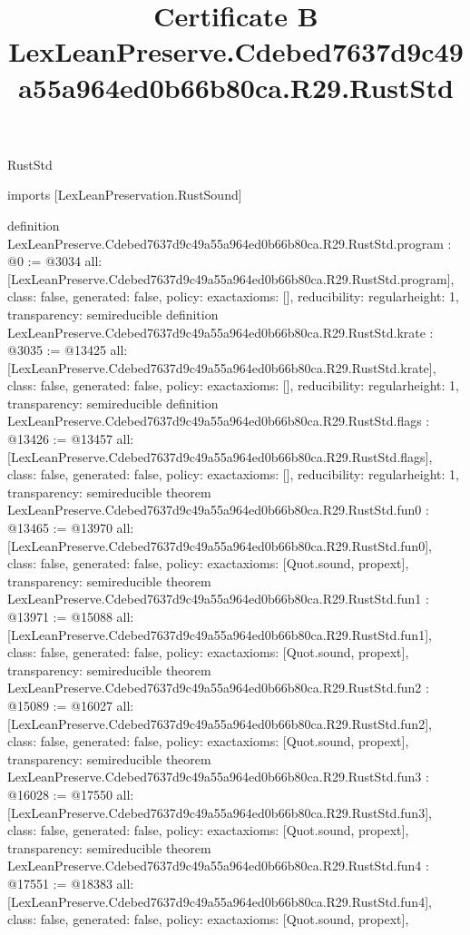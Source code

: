 \begin{lexlean}{RustStd}
\title{Certificate B LexLeanPreserve.Cdebed7637d9c49a55a964ed0b66b80ca.R29.RustStd}
\begin{coremodule}
imports [LexLeanPreservation.RustSound]

definition LexLeanPreserve.Cdebed7637d9c49a55a964ed0b66b80ca.R29.RustStd.program : @0 := @3034 {
  all: [LexLeanPreserve.Cdebed7637d9c49a55a964ed0b66b80ca.R29.RustStd.program],
  class: false,
  generated: false,
  policy: exact{axioms: []},
  reducibility: regular{height: 1},
  transparency: semireducible
}
definition LexLeanPreserve.Cdebed7637d9c49a55a964ed0b66b80ca.R29.RustStd.krate : @3035 := @13425 {
  all: [LexLeanPreserve.Cdebed7637d9c49a55a964ed0b66b80ca.R29.RustStd.krate],
  class: false,
  generated: false,
  policy: exact{axioms: []},
  reducibility: regular{height: 1},
  transparency: semireducible
}
definition LexLeanPreserve.Cdebed7637d9c49a55a964ed0b66b80ca.R29.RustStd.flags : @13426 := @13457 {
  all: [LexLeanPreserve.Cdebed7637d9c49a55a964ed0b66b80ca.R29.RustStd.flags],
  class: false,
  generated: false,
  policy: exact{axioms: []},
  reducibility: regular{height: 1},
  transparency: semireducible
}
theorem LexLeanPreserve.Cdebed7637d9c49a55a964ed0b66b80ca.R29.RustStd.fun0 : @13465 := @13970 {
  all: [LexLeanPreserve.Cdebed7637d9c49a55a964ed0b66b80ca.R29.RustStd.fun0],
  class: false,
  generated: false,
  policy: exact{axioms: [Quot.sound, propext]},
  transparency: semireducible
}
theorem LexLeanPreserve.Cdebed7637d9c49a55a964ed0b66b80ca.R29.RustStd.fun1 : @13971 := @15088 {
  all: [LexLeanPreserve.Cdebed7637d9c49a55a964ed0b66b80ca.R29.RustStd.fun1],
  class: false,
  generated: false,
  policy: exact{axioms: [Quot.sound, propext]},
  transparency: semireducible
}
theorem LexLeanPreserve.Cdebed7637d9c49a55a964ed0b66b80ca.R29.RustStd.fun2 : @15089 := @16027 {
  all: [LexLeanPreserve.Cdebed7637d9c49a55a964ed0b66b80ca.R29.RustStd.fun2],
  class: false,
  generated: false,
  policy: exact{axioms: [Quot.sound, propext]},
  transparency: semireducible
}
theorem LexLeanPreserve.Cdebed7637d9c49a55a964ed0b66b80ca.R29.RustStd.fun3 : @16028 := @17550 {
  all: [LexLeanPreserve.Cdebed7637d9c49a55a964ed0b66b80ca.R29.RustStd.fun3],
  class: false,
  generated: false,
  policy: exact{axioms: [Quot.sound, propext]},
  transparency: semireducible
}
theorem LexLeanPreserve.Cdebed7637d9c49a55a964ed0b66b80ca.R29.RustStd.fun4 : @17551 := @18383 {
  all: [LexLeanPreserve.Cdebed7637d9c49a55a964ed0b66b80ca.R29.RustStd.fun4],
  class: false,
  generated: false,
  policy: exact{axioms: [Quot.sound, propext]},
}
\end{coremodule}
\end{lexlean}

